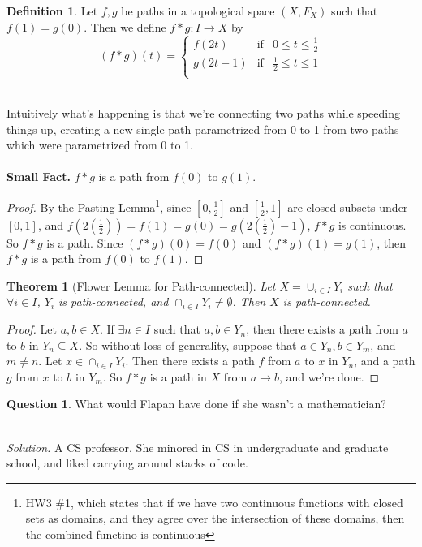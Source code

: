 \documentclass{article}
\newtheorem*{Thm}{Theorem}
\theoremstyle{definition}
\newtheorem*{Definition}{Definition}
\newtheorem*{Question}{Question}
\begin{document}
\begin{Definition} 
Let $f,g$ be paths in a topological space $(X,F_X)$ such that $f(1) = g(0)$. Then we define 
$f\ast g : I \to X$ by 
$$(f\ast g )(t) =
\left\{ 
\begin{array}{ccc} 
f(2t) & \text{if} & 0 \leq t\leq \frac{1}{2} \\
g(2t-1) & \text{if} & \frac{1}{2} \leq t \leq 1\\ \end{array} \right.$$
\end{Definition}
\text{}\\
Intuitively what's happening is that we're connecting two paths while  speeding things up, creating a new single path parametrized from 0 to 1 from two paths which were parametrized from 0 to 1. \\ \\
\textbf{Small Fact.}
$f\ast g$ is a path from $f(0)$ to $g(1)$. 
\begin{proof}
By the Pasting Lemma\footnote{HW3 \#1, which states that if we have two continuous functions with closed sets as domains, and they agree over the intersection of these domains, then the combined functino is continuous}, since $[0,\frac{1}{2}]$ and $[\frac{1}{2},1]$ are closed subsets under $[0,1]$, and $f(2 (\frac{1}{2} )) = f(1) = g(0) = g(2 (\frac{1}{2}) - 1 )$, $f\ast g$ is continuous. So $f\ast g$ is a path. Since $(f\ast g)(0) = f(0)$ and $(f\ast g) (1) = g(1)$, then $f\ast g$ is a path from $f(0)$ to $f(1)$. 
\end{proof}

\begin{Thm}[Flower Lemma for Path-connected]
Let $X = \cup_{i\in I} Y_i$ such that  $\forall i\in I$, $Y_i$ is path-connected, and $\cap_{i\in I} Y_i \neq \emptyset$. Then $X$ is path-connected.
\end{Thm}
\begin{proof}
Let $a,b\in X$. If $\exists n\in I$ such that $a,b\in Y_n$, then there exists a path from $a$ to $b$ in $Y_n\subseteq X$. So without loss of generality, suppose that $a\in Y_n, b\in Y_m$, and $m\neq n$. Let $x\in \cap_{i\in I} Y_i$. Then there exists a path $f$ from $a$ to $x$ in $Y_n$, and a path $g$ from $x$ to $b$ in $Y_m$. So $f\ast g$ is a path in $X$ from $a \to b$, and we're done. 
\end{proof}
\begin{Question}
What would Flapan have done if she wasn't a mathematician? 
\end{Question} 
\vspace{-.2in} \text{} \\
\textit{Solution.} A CS professor. She minored in CS in undergraduate and graduate school, and liked carrying around stacks of code.
\end{document}
